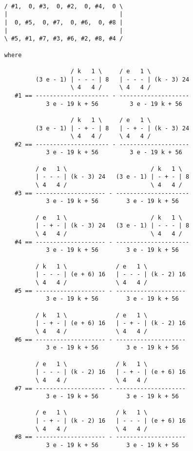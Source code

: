 \documentclass[../main.tex]{subfiles}
\begin{document}
\begin{verbatim}

    / #1,  0, #3,  0, #2,  0, #4,  0 \
    |                                |
    |  0, #5,  0, #7,  0, #6,  0, #8 |
    |                                |
    \ #5, #1, #7, #3, #6, #2, #8, #4 /
    
    where
    
                       / k   1 \     / e   1 \
             (3 e - 1) | - - - | 8   | - - - | (k - 3) 24
                       \ 4   4 /     \ 4   4 /
       #1 == --------------------- - --------------------
                3 e - 19 k + 56         3 e - 19 k + 56
    
                       / k   1 \     / e   1 \
             (3 e - 1) | - + - | 8   | - + - | (k - 3) 24
                       \ 4   4 /     \ 4   4 /
       #2 == --------------------- - --------------------
                3 e - 19 k + 56         3 e - 19 k + 56
    
             / e   1 \                        / k   1 \
             | - - - | (k - 3) 24   (3 e - 1) | - + - | 8
             \ 4   4 /                        \ 4   4 /
       #3 == -------------------- - ---------------------
                3 e - 19 k + 56        3 e - 19 k + 56
    
             / e   1 \                        / k   1 \
             | - + - | (k - 3) 24   (3 e - 1) | - - - | 8
             \ 4   4 /                        \ 4   4 /
       #4 == -------------------- - ---------------------
                3 e - 19 k + 56        3 e - 19 k + 56
    
             / k   1 \              / e   1 \
             | - - - | (e + 6) 16   | - - - | (k - 2) 16
             \ 4   4 /              \ 4   4 /
       #5 == -------------------- - --------------------
                3 e - 19 k + 56        3 e - 19 k + 56
    
             / k   1 \              / e   1 \
             | - + - | (e + 6) 16   | - + - | (k - 2) 16
             \ 4   4 /              \ 4   4 /
       #6 == -------------------- - --------------------
                3 e - 19 k + 56        3 e - 19 k + 56
    
             / e   1 \              / k   1 \
             | - - - | (k - 2) 16   | - + - | (e + 6) 16
             \ 4   4 /              \ 4   4 /
       #7 == -------------------- - --------------------
                3 e - 19 k + 56        3 e - 19 k + 56
    
             / e   1 \              / k   1 \
             | - + - | (k - 2) 16   | - - - | (e + 6) 16
             \ 4   4 /              \ 4   4 /
       #8 == -------------------- - --------------------
                3 e - 19 k + 56        3 e - 19 k + 56
    

\end{verbatim}
\end{document}
